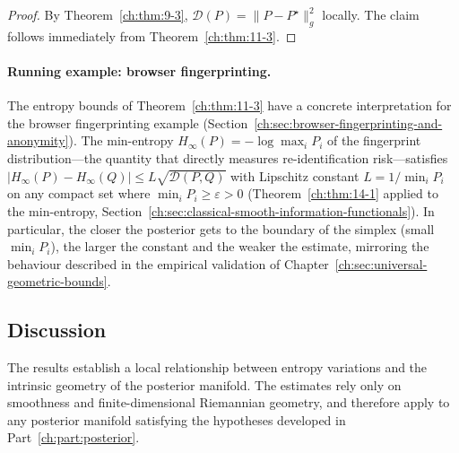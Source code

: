 \begin{proof}
By Theorem~\ref{ch:thm:9-3}, $\mathcal D(P)=\|P-P^\star\|_g^2$ locally.
The claim follows immediately from Theorem~\ref{ch:thm:11-3}.\end{proof}

\paragraph{Running example: browser fingerprinting.}
The entropy bounds of Theorem~\ref{ch:thm:11-3} have a concrete interpretation for the browser fingerprinting example (Section~\ref{ch:sec:browser-fingerprinting-and-anonymity}).  The min-entropy $H_\infty(P)=-\log\max_i P_i$ of the fingerprint distribution---the quantity that directly measures re-identification risk---satisfies $|H_\infty(P)-H_\infty(Q)|\le L\sqrt{\mathcal D(P,Q)}$ with Lipschitz constant $L=1/\min_i P_i$ on any compact set where $\min_i P_i\ge\varepsilon>0$ (Theorem~\ref{ch:thm:14-1} applied to the min-entropy, Section~\ref{ch:sec:classical-smooth-information-functionals}).  In particular, the closer the posterior gets to the boundary of the simplex (small $\min_i P_i$), the larger the constant and the weaker the estimate, mirroring the behaviour described in the empirical validation of Chapter~\ref{ch:sec:universal-geometric-bounds}.

\subsection{Discussion}\label{ch:sec:discussion-entropy_bounds}
The results establish a local relationship between entropy variations
and the intrinsic geometry of the posterior manifold.
The estimates rely only on smoothness and finite-dimensional Riemannian
geometry, and therefore apply to any posterior manifold satisfying the
hypotheses developed in Part~\ref{ch:part:posterior}.